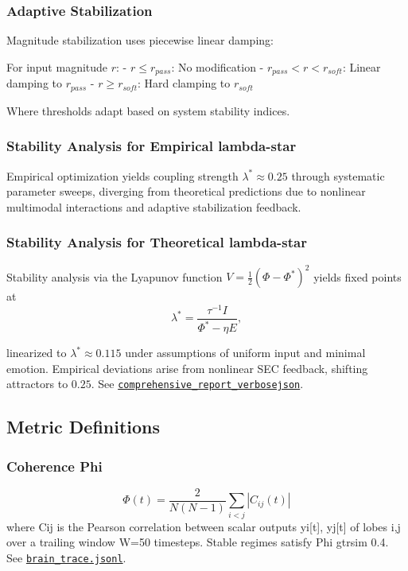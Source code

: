 \documentclass[11pt,a4paper]{article}
\begin{document}
\subsubsection{Adaptive Stabilization}

Magnitude stabilization uses piecewise linear damping:

For input magnitude $r$:
- $r \leq r_{pass}$: No modification
- $r_{pass} < r < r_{soft}$: Linear damping to $r_{pass}$
- $r \geq r_{soft}$: Hard clamping to $r_{soft}$

Where thresholds adapt based on system stability indices.

\subsubsection{Stability Analysis for Empirical lambda-star}

Empirical optimization yields coupling strength $\lambda^* \approx 0.25$ through systematic parameter sweeps, diverging from theoretical predictions due to nonlinear multimodal interactions and adaptive stabilization feedback.

\subsubsection{Stability Analysis for Theoretical lambda-star}

Stability analysis via the Lyapunov function
\( V = \tfrac{1}{2} (\Phi - \Phi^\ast)^2 \)
yields fixed points at
\[
  \lambda^\ast = \frac{\tau^{-1} I}{\Phi^\ast - \eta E},
\]

linearized to \(\lambda^\ast \approx 0.115\) under assumptions of uniform input and minimal emotion.
Empirical deviations arise from nonlinear SEC feedback, shifting attractors to \(0.25\).
See \href{https://github.com/jhcragin/SpiralBrain-v3.0-public/blob/main/ELASTIC_COGNITION_SPIRAL_ARCHITECTURE/results/comprehensive_report_verbose_20251125_213442.json}{\texttt{comprehensive\_report\_verbose\.json}}.


\subsection{Metric Definitions}

\subsubsection{Coherence Phi}
\[
\Phi(t) = \frac{2}{N(N-1)} \sum_{i<j} |C_{ij}(t)|
\]
where Cij is the Pearson correlation between scalar outputs yi[t], yj[t] of lobes i,j over a trailing window W=50 timesteps. Stable regimes satisfy Phi gtrsim 0.4. See \href{https://github.com/jhcragin/SpiralBrain-v3.0-public/blob/main/ELASTIC_COGNITION_SPIRAL_ARCHITECTURE/results/brain_trace.jsonl}
         {\texttt{brain\_trace.jsonl}}.
\end{document}
